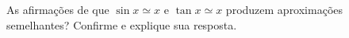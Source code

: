 As afirmações de que $\sin x \simeq x$ e $\tan x \simeq x$ produzem aproximações semelhantes? Confirme e explique sua resposta.

